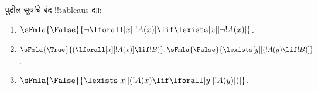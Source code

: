\documentclass[../../../include/open-logic-section]{subfiles}
\begin{document}
\begin{prob}
पुढील सूत्रांचे बंद !!{tableau}s द्या:
\begin{enumerate}
\item $\sFmla{\False}{\lnot\lforall[x][!A(x)] \lif \lexists[x][\lnot!A(x)]}$.
\item $\sFmla{\True}{(\lforall[x][!A(x)] \lif !B)}, \sFmla{\False}{\lexists[y][(!A(y) \lif !B)]}$.
\item $\sFmla{\False}{\lexists[x][(!A(x) \lif \lforall[y][!A(y)])]}$.
\end{enumerate}
\end{prob}
\end{document}
